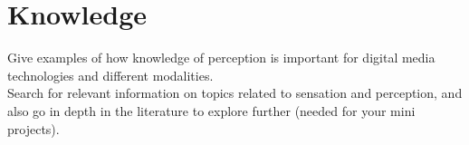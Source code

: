 \documentclass{article}
\begin{document}
\section{Knowledge}
Give examples of how knowledge of perception is important for digital media technologies and different modalities.\\

Search for relevant information on topics related to sensation and perception, and also go in depth in the literature to explore further (needed for your mini projects).
\end{document}
